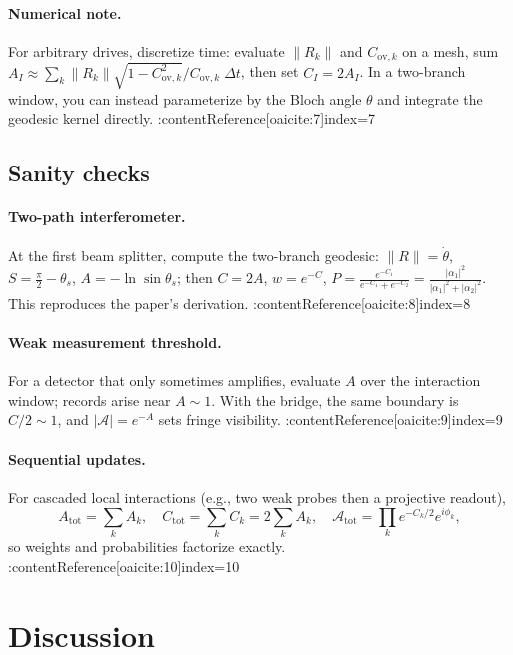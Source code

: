 \documentclass[11pt,letterpaper]{article}
\begin{document}
\paragraph{Numerical note.}
For arbitrary drives, discretize time: evaluate \(\|R_k\|\) and \(C_{\mathrm{ov},k}\) on a mesh, sum \(A_I\approx\sum_k \|R_k\|\sqrt{1-C_{\mathrm{ov},k}^2}/C_{\mathrm{ov},k}\;\Delta t\), then set \(C_I=2A_I\). In a two-branch window, you can instead parameterize by the Bloch angle \(\theta\) and integrate the geodesic kernel directly. :contentReference[oaicite:7]{index=7}

\subsection{Sanity checks}

\paragraph{Two-path interferometer.}
At the first beam splitter, compute the two-branch geodesic:
\(\|R\|=\dot\theta\), \(S=\tfrac{\pi}{2}-\theta_s\), \(A=-\ln\sin\theta_s\); then \(C=2A\), \(w=e^{-C}\), \(P=\frac{e^{-C_1}}{e^{-C_1}+e^{-C_2}}=\frac{|\alpha_1|^2}{|\alpha_1|^2+|\alpha_2|^2}\). This reproduces the paper’s derivation. :contentReference[oaicite:8]{index=8}

\paragraph{Weak measurement threshold.}
For a detector that only sometimes amplifies, evaluate \(A\) over the interaction window; records arise near \(A\sim 1\). With the bridge, the same boundary is \(C/2\sim 1\), and \(|\mathcal A|=e^{-A}\) sets fringe visibility. :contentReference[oaicite:9]{index=9}

\paragraph{Sequential updates.}
For cascaded local interactions (e.g., two weak probes then a projective readout),
\[
A_{\mathrm{tot}}=\sum_k A_k,\quad
C_{\mathrm{tot}}=\sum_k C_k=2\sum_k A_k,\quad
\mathcal A_{\mathrm{tot}}=\prod_k e^{-C_k/2}e^{i\phi_k},
\]
so weights and probabilities factorize exactly. :contentReference[oaicite:10]{index=10}

\section{Discussion}
\label{sec:discussion}
\end{document}
